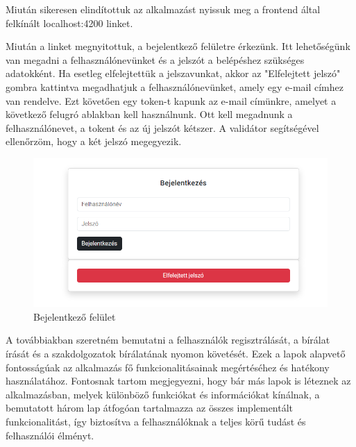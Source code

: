 Miután sikeresen elindítottuk az alkalmazást nyissuk meg a frontend által felkínált localhost:4200 linket.


Miután a linket megnyitottuk, a bejelentkező felületre érkezünk. Itt lehetőségünk van megadni a felhasználónevünket és a jelszót a belépéshez szükséges adatokként. Ha esetleg elfelejtettük a jelszavunkat, akkor az "Elfelejtett jelszó" gombra kattintva megadhatjuk a felhasználónevünket, amely egy e-mail címhez van rendelve. Ezt követően egy token-t kapunk az e-mail címünkre, amelyet a következő felugró ablakban kell használnunk. Ott kell megadnunk a felhasználónevet, a tokent és az új jelszót kétszer. A validátor segítségével ellenőrzöm, hogy a két jelszó megegyezik.

\begin{figure}[h]
\centering
\includegraphics[width=\textwidth]{images/login.png}
\caption{Bejelentkező felület}
\label{fig:login}
\end{figure}

\newpage

A továbbiakban szeretném bemutatni a felhasználók regisztrálását, a bírálat írását és a szakdolgozatok bírálatának nyomon követését. Ezek a lapok alapvető fontosságúak az alkalmazás fő funkcionalitásainak megértéséhez és hatékony használatához. Fontosnak tartom megjegyezni, hogy bár más lapok is léteznek az alkalmazásban, melyek különböző funkciókat és információkat kínálnak, a bemutatott három lap átfogóan tartalmazza az összes implementált funkcionalitást, így biztosítva a felhasználóknak a teljes körű tudást és felhasználói élményt.





